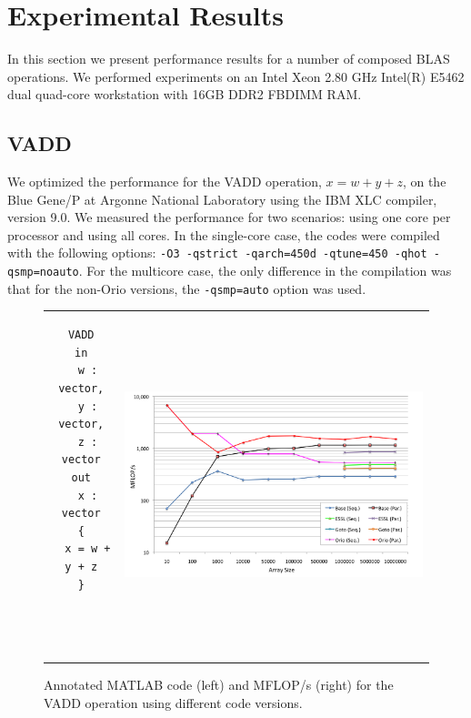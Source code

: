 \documentclass[11pt]{article}
\begin{document}
\section{Experimental Results}
\label{sec:experiments}

In this section we present performance results for a number of composed BLAS operations. We performed experiments on an Intel Xeon 2.80 GHz Intel(R) E5462 dual quad-core workstation with 16GB DDR2 FBDIMM RAM.


\subsection{VADD}

We optimized the performance for the VADD operation, $x = w + y + z$, on the Blue Gene/P at Argonne National Laboratory using the IBM XLC compiler, version 9.0. We measured the performance for two scenarios: using one core per processor and using all cores. In the single-core case, the codes were compiled with the following options: \texttt{-O3 -qstrict -qarch=450d -qtune=450 -qhot -qsmp=noauto}. For the multicore case, the only difference in the compilation was that for the non-Orio versions, the \texttt{-qsmp=auto} option was used.

\begin{figure}[htp]
\centering
\begin{tabular}{cc}
\begin{minipage}[b]{.25\textwidth}
\footnotesize
\begin{verbatim}
VADD
in
  w : vector,
  y : vector,
  z : vector
out
  x : vector
{
  x = w + y + z
}




\end{verbatim}
\end{minipage}
&
\begin{minipage}[b]{.6\textwidth}
\includegraphics[width=\textwidth]{figures/vadd_bgp.png}
\end{minipage}\\
\end{tabular}
\caption{Annotated MATLAB code (left) and MFLOP/s (right) for the VADD operation using different code versions.}
\label{fig:atax}
\end{figure}
\end{document}

